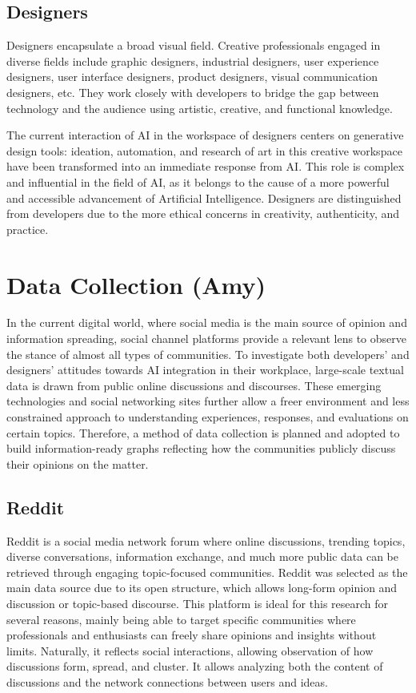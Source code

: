 \documentclass[conference]{IEEEtran}
\begin{document}
\subsection{Designers}
Designers encapsulate a broad visual field. Creative professionals engaged in diverse fields include graphic designers, industrial designers, user experience designers, user interface designers, product designers, visual communication designers, etc. They work closely with developers to bridge the gap between technology and the audience using artistic, creative, and functional knowledge.

The current interaction of AI in the workspace of designers centers on generative design tools: ideation, automation, and research of art in this creative workspace have been transformed into an immediate response from AI. This role is complex and influential in the field of AI, as it belongs to the cause of a more powerful and accessible advancement of Artificial Intelligence. Designers are distinguished from developers due to the more ethical concerns in creativity, authenticity, and practice.

\section{Data Collection (Amy)}
In the current digital world, where social media is the main source of opinion and information spreading, social channel platforms provide a relevant lens to observe the stance of almost all types of communities. To investigate both developers' and designers' attitudes towards AI integration in their workplace, large-scale textual data is drawn from public online discussions and discourses. These emerging technologies and social networking sites further allow a freer environment and less constrained approach to understanding experiences, responses, and evaluations on certain topics. Therefore, a method of data collection is planned and adopted to build information-ready graphs reflecting how the communities publicly discuss their opinions on the matter.

\subsection{Reddit}
Reddit is a social media network forum where online discussions, trending topics, diverse conversations, information exchange, and much more public data can be retrieved through engaging topic-focused communities. Reddit was selected as the main data source due to its open structure, which allows long-form opinion and discussion or topic-based discourse. This platform is ideal for this research for several reasons, mainly being able to target specific communities where professionals and enthusiasts can freely share opinions and insights without limits. Naturally, it reflects social interactions, allowing observation of how discussions form, spread, and cluster. It allows analyzing both the content of discussions and the network connections between users and ideas.
\end{document}
